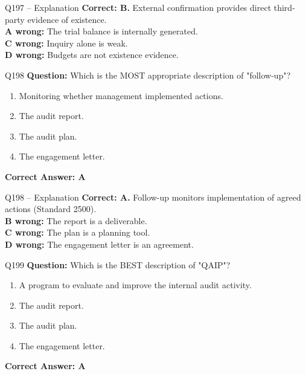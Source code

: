 \documentclass[aspectratio=169,10pt]{beamer}
\begin{document}
	\begin{frame}[t]{Q197 -- Explanation}
		\small
		\textbf{Correct: B.} External confirmation provides direct third-party evidence of existence. \\[4pt]
		\textbf{A wrong:} The trial balance is internally generated. \\[2pt]
		\textbf{C wrong:} Inquiry alone is weak. \\[2pt]
		\textbf{D wrong:} Budgets are not existence evidence.
	\end{frame}
	
	\begin{frame}[t]{Q198}
		\small
		\textbf{Question:} Which is the MOST appropriate description of "follow-up"?
		\begin{enumerate}[label=\Alph*.,itemsep=1pt,topsep=2pt]
			\item Monitoring whether management implemented actions.
			\item The audit report.
			\item The audit plan.
			\item The engagement letter.
		\end{enumerate}
		\vspace{4pt}
		\textbf{Correct Answer: A}
	\end{frame}
	
	\begin{frame}[t]{Q198 -- Explanation}
		\small
		\textbf{Correct: A.} Follow-up monitors implementation of agreed actions (Standard 2500). \\[4pt]
		\textbf{B wrong:} The report is a deliverable. \\[2pt]
		\textbf{C wrong:} The plan is a planning tool. \\[2pt]
		\textbf{D wrong:} The engagement letter is an agreement.
	\end{frame}
	
	\begin{frame}[t]{Q199}
		\small
		\textbf{Question:} Which is the BEST description of "QAIP"?
		\begin{enumerate}[label=\Alph*.,itemsep=1pt,topsep=2pt]
			\item A program to evaluate and improve the internal audit activity.
			\item The audit report.
			\item The audit plan.
			\item The engagement letter.
		\end{enumerate}
		\vspace{4pt}
		\textbf{Correct Answer: A}
	\end{frame}
	
\end{document}
